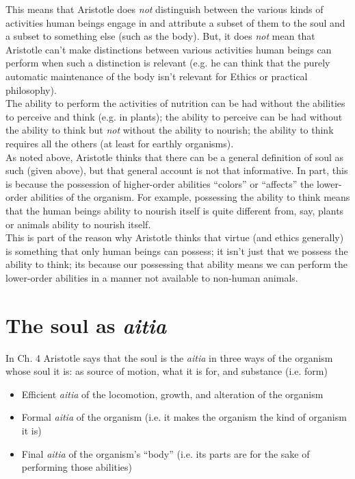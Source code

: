 \documentclass[11pt]{article}
\begin{document}
\noindent This means that Aristotle does \emph{not} distinguish between the various kinds of activities human beings engage in and attribute a subset of them to the soul and a subset to something else (such as the body). But, it does \emph{not} mean that Aristotle can't make distinctions between various activities human beings can perform when such a distinction is relevant (e.g. he can think that the purely automatic maintenance of the body isn't relevant for Ethics or practical philosophy).\\

\noindent The ability to perform the activities of nutrition can be had without the abilities to perceive and think (e.g. in plants); the ability to perceive can be had without the ability to think but \emph{not} without the ability to nourish; the ability to think requires all the others (at least for earthly organisms).\\

\noindent As noted above, Aristotle thinks that there can be a general definition of soul as such (given above), but that general account is not that informative. In part, this is because the possession of higher-order abilities ``colors'' or ``affects'' the lower-order abilities of the organism. For example, possessing the ability to think means that the human beings ability to nourish itself is quite different from, say, plants or animals ability to nourish itself.\\

\noindent This is part of the reason why Aristotle thinks that virtue (and ethics generally) is something that only human beings can possess; it isn't just that we possess the ability to think; its because our possessing that ability means we can perform the lower-order abilities in a manner not available to non-human animals.

\section*{The soul as \emph{aitia}}

\noindent In Ch. 4 Aristotle says that the soul is the \emph{aitia} in three ways of the organism whose soul it is: as source of motion, what it is for, and substance (i.e. form)
\begin{itemize}
\item Efficient \emph{aitia} of the locomotion, growth, and alteration of the organism

\item Formal \emph{aitia} of the organism (i.e. it makes the organism the kind of organism it is)

\item Final \emph{aitia} of the organism's ``body'' (i.e. its parts are for the sake of performing those abilities)
\end{itemize}
\end{document}
